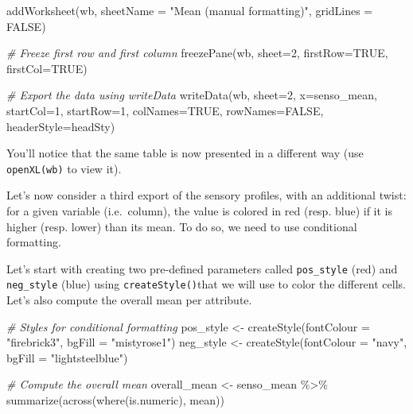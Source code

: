 \documentclass[
]{krantz}
\makeatletter
\newenvironment{Shaded}{\begin{snugshade}}{\end{snugshade}}
\newcommand{\AttributeTok}[1]{\textcolor[rgb]{0.61,0.61,0.61}{#1}}
\newcommand{\CommentTok}[1]{\textcolor[rgb]{0.37,0.37,0.37}{\textit{#1}}}
\newcommand{\ConstantTok}[1]{\textcolor[rgb]{0,0,0}{#1}}
\newcommand{\DecValTok}[1]{\textcolor[rgb]{0.06,0.06,0.06}{#1}}
\newcommand{\FunctionTok}[1]{\textcolor[rgb]{0,0,0}{#1}}
\newcommand{\NormalTok}[1]{#1}
\newcommand{\OtherTok}[1]{\textcolor[rgb]{0.37,0.37,0.37}{#1}}
\newcommand{\SpecialCharTok}[1]{\textcolor[rgb]{0,0,0}{#1}}
\newcommand{\StringTok}[1]{\textcolor[rgb]{0.5,0.5,0.5}{#1}}
\newenvironment{kframe}{%
\medskip{}
\setlength{\fboxsep}{.8em}
 \def\at@end@of@kframe{}%
 \ifinner\ifhmode%
  \def\at@end@of@kframe{\end{minipage}}%
  \begin{minipage}{\columnwidth}%
 \fi\fi%
 \def\FrameCommand##1{\hskip\@totalleftmargin \hskip-\fboxsep
 \colorbox{shadecolor}{##1}\hskip-\fboxsep
     \hskip-\linewidth \hskip-\@totalleftmargin \hskip\columnwidth}%
 \MakeFramed {\advance\hsize-\width
   \@totalleftmargin\z@ \linewidth\hsize
   \@setminipage}}%
 {\par\unskip\endMakeFramed%
 \at@end@of@kframe}
\renewenvironment{Shaded}{\begin{kframe}}{\end{kframe}}
\makeatother
\begin{document}
\begin{Shaded}
\begin{Highlighting}[]
\FunctionTok{addWorksheet}\NormalTok{(wb, }\AttributeTok{sheetName =} \StringTok{"Mean (manual formatting)"}\NormalTok{, }\AttributeTok{gridLines =} \ConstantTok{FALSE}\NormalTok{)}

\CommentTok{\# Freeze first row and first column}
\FunctionTok{freezePane}\NormalTok{(wb, }\AttributeTok{sheet=}\DecValTok{2}\NormalTok{, }\AttributeTok{firstRow=}\ConstantTok{TRUE}\NormalTok{, }\AttributeTok{firstCol=}\ConstantTok{TRUE}\NormalTok{)}

\CommentTok{\# Export the data using writeData}
\FunctionTok{writeData}\NormalTok{(wb, }\AttributeTok{sheet=}\DecValTok{2}\NormalTok{, }\AttributeTok{x=}\NormalTok{senso\_mean, }\AttributeTok{startCol=}\DecValTok{1}\NormalTok{, }\AttributeTok{startRow=}\DecValTok{1}\NormalTok{, }\AttributeTok{colNames=}\ConstantTok{TRUE}\NormalTok{, }\AttributeTok{rowNames=}\ConstantTok{FALSE}\NormalTok{, }\AttributeTok{headerStyle=}\NormalTok{headSty)}
\end{Highlighting}
\end{Shaded}

You'll notice that the same table is now presented in a different way (use \texttt{openXL(wb)} to view it).

Let's now consider a third export of the sensory profiles, with an additional twist: for a given variable (i.e.~column), the value is colored in red (resp. blue) if it is higher (resp. lower) than its mean. To do so, we need to use conditional formatting.

Let's start with creating two pre-defined parameters called \texttt{pos\_style} (red) and \texttt{neg\_style} (blue) using \texttt{createStyle()}that we will use to color the different cells. Let's also compute the overall mean per attribute.

\begin{Shaded}
\begin{Highlighting}[]
\CommentTok{\# Styles for conditional formatting}
\NormalTok{pos\_style }\OtherTok{\textless{}{-}} \FunctionTok{createStyle}\NormalTok{(}\AttributeTok{fontColour =} \StringTok{"firebrick3"}\NormalTok{, }\AttributeTok{bgFill =} \StringTok{"mistyrose1"}\NormalTok{)}
\NormalTok{neg\_style }\OtherTok{\textless{}{-}} \FunctionTok{createStyle}\NormalTok{(}\AttributeTok{fontColour =} \StringTok{"navy"}\NormalTok{, }\AttributeTok{bgFill =} \StringTok{"lightsteelblue"}\NormalTok{)}

\CommentTok{\# Compute the overall mean}
\NormalTok{overall\_mean }\OtherTok{\textless{}{-}}\NormalTok{ senso\_mean }\SpecialCharTok{\%\textgreater{}\%} 
  \FunctionTok{summarize}\NormalTok{(}\FunctionTok{across}\NormalTok{(}\FunctionTok{where}\NormalTok{(is.numeric), mean))}
\end{Highlighting}
\end{Shaded}
\end{document}
